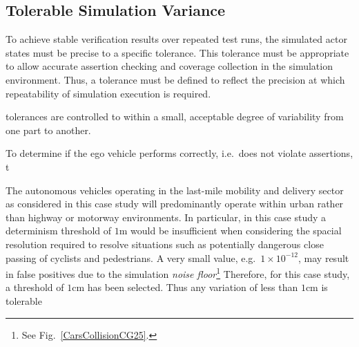 \documentclass[letterpaper, 10 pt, journal, twoside]{IEEEtran}
\begin{document}

\subsection{Tolerable Simulation Variance}


To achieve stable verification results over repeated test runs, the simulated actor states must be precise to a specific tolerance.
%
This tolerance must be appropriate to allow accurate assertion checking and coverage collection in the simulation environment.
%
Thus, a tolerance must be defined to reflect the precision at which repeatability of simulation execution is required. 




tolerances are controlled to within a small, acceptable degree of variability from one part to another.


%

To determine if the ego vehicle performs correctly, i.e.\ does not violate assertions, t





The autonomous vehicles operating in the last-mile mobility and delivery sector as considered in this case study will predominantly operate within urban rather than highway or motorway environments. 
%
In particular, in this case study a determinism threshold of $1$m would be insufficient when considering the spacial resolution required to resolve situations such as potentially dangerous close passing of cyclists and pedestrians. A very small value, e.g.\ $1\times10^{-12}$, may result in false positives due to the simulation \textit{noise floor}\footnote{See Fig.~\ref{CarsCollisionCG25}.} Therefore, for this case study, a threshold of $1$cm has been selected. Thus any variation of less than $1$cm is tolerable 
\end{document}
